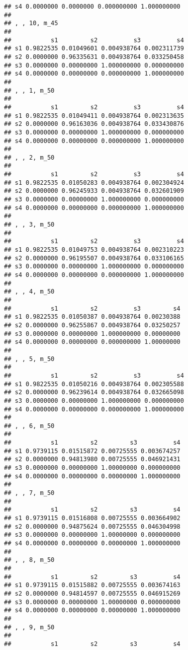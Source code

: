 \documentclass[
]{article}
\begin{document}
\begin{verbatim}
## s4 0.0000000 0.0000000 0.000000000 1.000000000
## 
## , , 10, m_45
## 
##           s1         s2          s3          s4
## s1 0.9822535 0.01049601 0.004938764 0.002311739
## s2 0.0000000 0.96335631 0.004938764 0.033250458
## s3 0.0000000 0.00000000 1.000000000 0.000000000
## s4 0.0000000 0.00000000 0.000000000 1.000000000
## 
## , , 1, m_50
## 
##           s1         s2          s3          s4
## s1 0.9822535 0.01049411 0.004938764 0.002313635
## s2 0.0000000 0.96163036 0.004938764 0.033430876
## s3 0.0000000 0.00000000 1.000000000 0.000000000
## s4 0.0000000 0.00000000 0.000000000 1.000000000
## 
## , , 2, m_50
## 
##           s1         s2          s3          s4
## s1 0.9822535 0.01050283 0.004938764 0.002304924
## s2 0.0000000 0.96245933 0.004938764 0.032601909
## s3 0.0000000 0.00000000 1.000000000 0.000000000
## s4 0.0000000 0.00000000 0.000000000 1.000000000
## 
## , , 3, m_50
## 
##           s1         s2          s3          s4
## s1 0.9822535 0.01049753 0.004938764 0.002310223
## s2 0.0000000 0.96195507 0.004938764 0.033106165
## s3 0.0000000 0.00000000 1.000000000 0.000000000
## s4 0.0000000 0.00000000 0.000000000 1.000000000
## 
## , , 4, m_50
## 
##           s1         s2          s3         s4
## s1 0.9822535 0.01050387 0.004938764 0.00230388
## s2 0.0000000 0.96255867 0.004938764 0.03250257
## s3 0.0000000 0.00000000 1.000000000 0.00000000
## s4 0.0000000 0.00000000 0.000000000 1.00000000
## 
## , , 5, m_50
## 
##           s1         s2          s3          s4
## s1 0.9822535 0.01050216 0.004938764 0.002305588
## s2 0.0000000 0.96239614 0.004938764 0.032665098
## s3 0.0000000 0.00000000 1.000000000 0.000000000
## s4 0.0000000 0.00000000 0.000000000 1.000000000
## 
## , , 6, m_50
## 
##           s1         s2         s3          s4
## s1 0.9739115 0.01515872 0.00725555 0.003674257
## s2 0.0000000 0.94813980 0.00725555 0.046921431
## s3 0.0000000 0.00000000 1.00000000 0.000000000
## s4 0.0000000 0.00000000 0.00000000 1.000000000
## 
## , , 7, m_50
## 
##           s1         s2         s3          s4
## s1 0.9739115 0.01516808 0.00725555 0.003664902
## s2 0.0000000 0.94875624 0.00725555 0.046304998
## s3 0.0000000 0.00000000 1.00000000 0.000000000
## s4 0.0000000 0.00000000 0.00000000 1.000000000
## 
## , , 8, m_50
## 
##           s1         s2         s3          s4
## s1 0.9739115 0.01515882 0.00725555 0.003674163
## s2 0.0000000 0.94814597 0.00725555 0.046915269
## s3 0.0000000 0.00000000 1.00000000 0.000000000
## s4 0.0000000 0.00000000 0.00000000 1.000000000
## 
## , , 9, m_50
## 
##           s1         s2         s3          s4

\end{verbatim}
\end{document}
